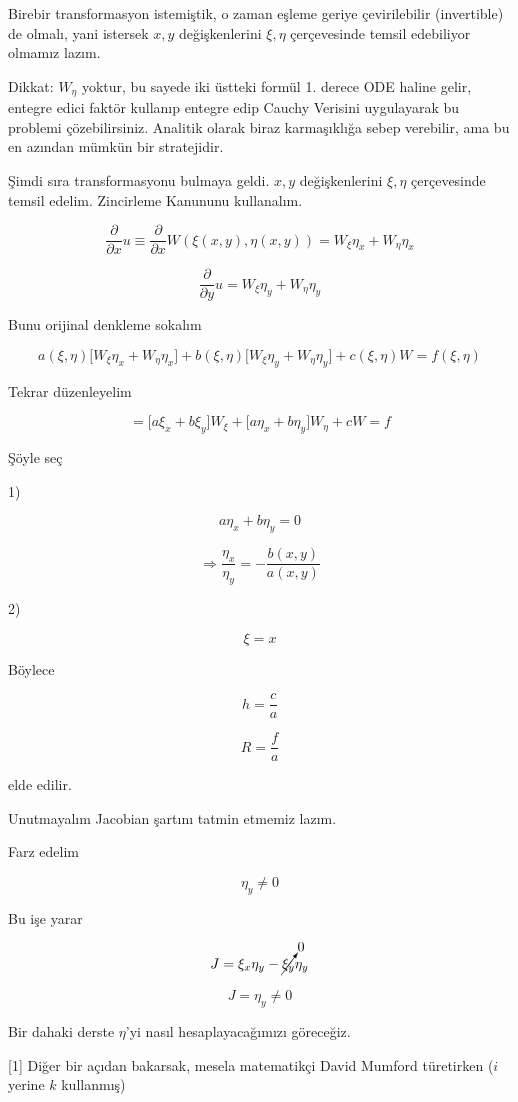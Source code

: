 \documentclass[12pt,fleqn]{article}\usepackage{../../common}
\begin{document}
Birebir transformasyon istemiştik, o zaman eşleme geriye çevirilebilir
(invertible) de olmalı, yani istersek $x,y$ değişkenlerini $\xi,\eta$
çerçevesinde temsil edebiliyor olmamız lazım. 

Dikkat: $W_\eta$ yoktur, bu sayede iki üstteki formül 1. derece ODE haline
gelir, entegre edici faktör kullanıp entegre edip Cauchy Verisini
uygulayarak bu problemi çözebilirsiniz. Analitik olarak biraz karmaşıklığa
sebep verebilir, ama bu en azından mümkün bir stratejidir. 

Şimdi sıra transformasyonu bulmaya geldi. $x,y$ değişkenlerini $\xi,\eta$
çerçevesinde temsil edelim. Zincirleme Kanununu kullanalım. 

$$ \frac{\partial }{\partial x}u \equiv
\frac{\partial }{\partial x}W(\xi(x,y),\eta(x,y)) =
W_\xi\eta_x + W_\eta\eta_x 
 $$

$$ \frac{\partial }{\partial y}u =
W_\xi\eta_y + W_\eta\eta_y
 $$

Bunu orijinal denkleme sokalım 

$$ 
a(\xi,\eta) \bigg[W_\xi \eta_x + W_\eta\eta_x \bigg] +
b(\xi,\eta) \bigg[W_\xi \eta_y + W_\eta\eta_y  \bigg] + 
c(\xi,\eta)W = f(\xi,\eta)
 $$

Tekrar düzenleyelim

$$ = 
\bigg[ a\xi_x + b\xi_y \bigg] W_\xi + 
\bigg[ a\eta_x + b\eta_y \bigg] W_\eta +
cW = f
 $$

Şöyle seç

1)

$$ a \eta_x + b \eta_y = 0 $$

$$ \Rightarrow \frac{\eta_x}{\eta_y} = -\frac{b(x,y)}{a(x,y)}$$

2)

$$ \xi = x $$

Böylece 

$$ h = \frac{c}{a} $$

$$ R = \frac{f}{a} $$

elde edilir. 

Unutmayalım Jacobian şartını tatmin etmemiz lazım. 

Farz edelim 

$$ \eta_y \ne 0 $$

Bu işe yarar 

$$ J = \xi_x\eta_y - \cancelto{0}{\xi_y}\eta_y $$

$$ J = \eta_y \ne 0 $$

Bir dahaki derste $\eta$'yi nasıl hesaplayacağımızı göreceğiz. 

[1] Diğer bir açıdan bakarsak, mesela matematikçi David Mumford
türetirken ($i$ yerine $k$ kullanmış)
\end{document}
